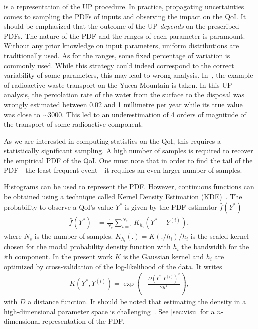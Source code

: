  is a representation of the UP procedure. In practice, propagating uncertainties comes to sampling the PDFs of inputs and observing the impact on the QoI. It should be emphasized that the outcome of the UP \emph{depends} on the prescribed PDFs. The nature of the PDF and the ranges of each parameter is paramount. Without any prior knowledge on input parameters, uniform distributions are traditionally used. As for the ranges, some fixed percentage of variation is commonly used. While this strategy could indeed correspond to the correct variability of some parameters, this may lead to wrong analysis. In~\citep{pilkey}, the example of radioactive waste transport on the Yucca Mountain is taken. In this UP analysis, the percolation rate of the water from the surface to the disposal was wrongly estimated between 0.02 and 1 millimetre per year while its true value was close to $\sim 3000$. This led to an underestimation of 4 orders of magnitude of the transport of some radioactive component.

As we are interested in computing statistics on the QoI, this requires a statistically significant sampling. A high number of samples is required to recover the empirical PDF of the QoI. One must note that in order to find the tail of the PDF---the least frequent event---it requires an even larger number of samples.

Histograms can be used to represent the PDF. However, continuous functions can be obtained using a technique called Kernel Density Estimation (KDE)~\cite{Wand1995}. The probability to observe a QoI's value $Y^*$ is given by the PDF estimator $\hat{f}(Y^*)$
\begin{align}
\hat{f}(Y^*)&= \frac{1}{N_{s}}\sum_{i=1}^{N_{s}} K_{h_i}(Y^*-Y^{(i)}),
\end{align}
\noindent where $N_s$ is the number of samples. $K_{h_i}(.) = K(./h_i)/h_i$ is the scaled kernel chosen for the modal probability density function with $h_{i}$ the bandwidth for the \emph{i}th component. In the present work $K$ is the Gaussian kernel and $h_{i}$ are optimized by cross-validation of the log-likelihood of the data. It writes
\begin{align}
K\left(Y^*,Y^{(i)}\right) = \exp\left( - \frac{D\left(Y^*,Y^{(i)}\right)^2}{2h^2} \right), \label{eq:kde}
\end{align}
\noindent with $D$ a distance function. It should be noted that estimating the density in a high-dimensional parameter space is challenging~\citep{Scholkopf1999,Scott2015}. See \cref{sec:visu} for a $n$-dimensional representation of the PDF.

